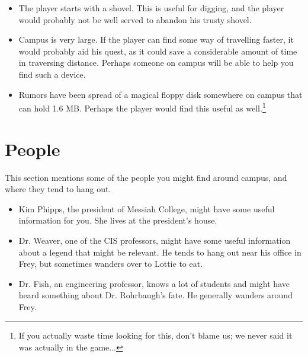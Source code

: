 \documentclass{report}
\begin{document}
\begin{itemize}
\item The player starts with a shovel. This is useful for digging, and the player would probably not be well served to abandon his trusty shovel.

\item Campus is very large. If the player can find some way of travelling faster, it would probably aid his quest, as it could save a considerable amount of time in traversing distance. Perhaps someone on campus will be able to help you find such a device.

\item Rumors have been spread of a magical floppy disk somewhere on campus that can hold 1.6 MB. Perhaps the player would find this useful as well.\footnote{If you actually waste time looking for this, don't blame us; we never said it was actually in the game...}
\end{itemize}

\section{People}
This section mentions some of the people you might find around campus, and where they tend to hang out.

\begin{itemize}
\item Kim Phipps, the president of Messiah College, might have some useful information for you. She lives at the president's house.
\item Dr. Weaver, one of the CIS professors, might have some useful information about a legend that might be relevant. He tends to hang out near his office in Frey, but sometimes wanders over to Lottie to eat.
\item Dr. Fish, an engineering professor, knows a lot of students and might have heard something about Dr. Rohrbaugh's fate. He generally wanders around Frey.
\end{itemize}
\end{document}
